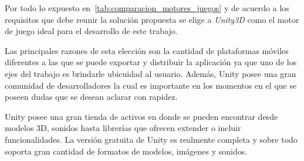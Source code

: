 \restoregeometry

Por todo lo expuesto en~\ref{tab:comparacion_motores_juegos} y de acuerdo a los
requisitos que debe reunir la solución propuesta se elige a \textit{Unity3D} como el
motor de juego ideal para el desarrollo de este trabajo.

Las principales razones de esta elección son la cantidad de plataformas móviles
diferentes a las que se puede exportar y distribuir la aplicación ya que uno de
los ejes del trabajo es brindarle ubicuidad al usuario. Además, Unity posee una
gran comunidad de desarrolladores la cual es importante en los momentos en el
que se poseen dudas que se desean aclarar con rapidez.

Unity posee una gran tienda de activos en donde se pueden encontrar desde
modelos 3D, sonidos hasta librerías que ofrecen extender o incluir
funcionalidades. La versión gratuita de Unity es realmente completa y sobre todo
soporta gran cantidad de formatos de modelos, imágenes y sonidos.
